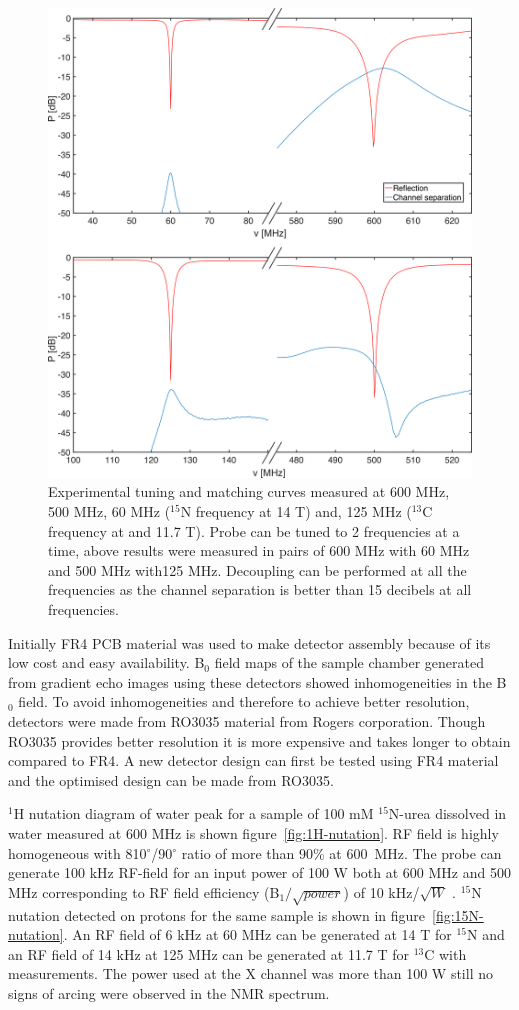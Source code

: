 \documentclass[preprint,12pt]{article}
\begin{document}
\begin{figure}
\centering
\includegraphics[width=.7\linewidth,keepaspectratio=true]{./figures/ms5n17-tlp-im-180710-tandm-sameaxis.png} 
\caption{Experimental tuning and matching curves measured at 600 MHz, 500 MHz, 60 MHz ($^{15}$N frequency at 14 T) and, 125 MHz ($^{13}$C frequency at  and 11.7 T). Probe can be tuned to 2 frequencies at a time, above results were measured in pairs of 600 MHz with 60 MHz and 500 MHz with125 MHz. Decoupling can be performed at all the frequencies as the channel separation is better than 15 decibels at all frequencies.}
\label{fig:tandm} 
\end{figure}
Initially FR4 PCB material was used to make detector assembly because of its low cost and easy availability. B$_0$ field maps of the sample chamber generated from gradient echo images using these detectors showed inhomogeneities in the B$_0$ field. To avoid inhomogeneities and therefore to achieve better resolution, detectors were made from RO3035 material from Rogers corporation. Though RO3035 provides better resolution it is more expensive and takes longer to obtain compared to FR4. A new detector design can first be tested using FR4 material and the optimised design can be made from RO3035.\par
$^1$H nutation diagram of water peak for a sample of 100 mM $^{15}$N-urea dissolved in water measured at 600 MHz is shown figure~\ref{fig:1H-nutation}. RF field is highly homogeneous with 810$^{\circ}$/90$^{\circ}$ ratio of more than 90\% at 600~MHz. The probe can generate 100 kHz RF-field for an input power of 100 W both at 600 MHz and 500 MHz corresponding to RF field efficiency (B$_{1}/\sqrt{power}$) of 10 kHz/$\sqrt{W}$ . $^{15}$N nutation detected on protons for the same sample is shown in figure~\ref{fig:15N-nutation}. An RF field of 6 kHz at 60 MHz can be generated at 14 T for $^{15}$N and an RF field of 14 kHz at 125 MHz can be generated at 11.7 T for $^{13}$C with measurements. The power used at the X channel was more than 100 W still no signs of arcing were observed in the NMR spectrum.\par
\end{document}
